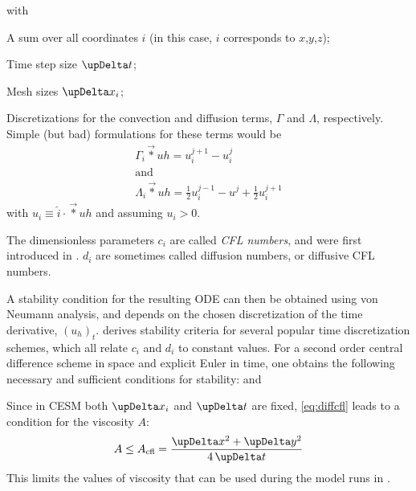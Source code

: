 %
with
%
\begin{items}
\item A sum over all coordinates \(i\) (in this case, \(i\) corresponds to \(x\),\(y\),\(z\));
\item Time step size \(\updel t\);
\item Mesh sizes \(\updel x_i\);
\item Discretizations for the convection and diffusion terms, \(\Gamma\) and \(\Lambda\), respectively. Simple (but bad) formulations for these terms would be
	\begin{gather}
	\Gamma_i \vec*{u}{h} = u_i^{j+1} - u_i^{j} \\
	\text{and} \\
	\Lambda_i \vec*{u}{h} = \frac{1}{2} u_i^{j-1} - u^j + \frac{1}{2} u_i^{j+1}
	\end{gather}
	with \(u_i \equiv \hat{i}\cdot\vec*{u}{h}\) and assuming \(u_i > 0\).
\end{items}
%
The dimensionless parameters \(c_i\) are called \emph{CFL numbers}, and were first introduced in \cite{cfl}. \(d_i\) are sometimes called diffusion numbers, or diffusive CFL numbers.

A stability condition for the resulting \ac{ODE} can then be obtained using \eg von Neumann analysis, and depends on the chosen discretization of the time derivative, \((u_h)_t\). \citet{wesselingcfd} derives stability criteria for several popular time discretization schemes, which all relate \(c_i\) and \(d_i\) to constant values. For a second order central difference scheme in space and explicit Euler in time, one obtains the following necessary and sufficient conditions for stability:
%
%
and
%

Since in \ac{CESM} both \(\updel x_i\) and \(\updel t\) are fixed, \eqref{eq:diffcfl} leads to a condition for the viscosity \(A\):
%
\begin{equation}
A \leq A_\text{cfl} = \frac{\updel x^2 + \updel y^2}{4 \updel t} \label{eq:cflcesm}
\end{equation} 
%
This limits the values of viscosity that can be used during the model runs in .

